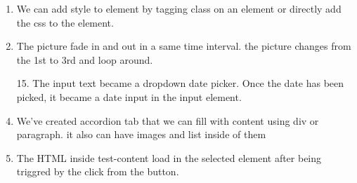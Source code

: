 \documentclass[12pt,titlepage]{article}
\begin{document}
\begin{enumerate}
    \item We can add style to element by tagging class on an element or directly add the css to the element.
    \item The picture fade in and out in a same time interval. the picture changes from the 1st to 3rd and loop around.
    \item[15.] The input text became a dropdown date picker. Once the date has been picked, it became a date input in the input element.
    \item We've created accordion tab that we can fill with content using div or paragraph. it also can have images and list inside of them
    \item The HTML inside test-content load in the selected element after being triggred by the click from the button.
\end{enumerate}
\end{document}
